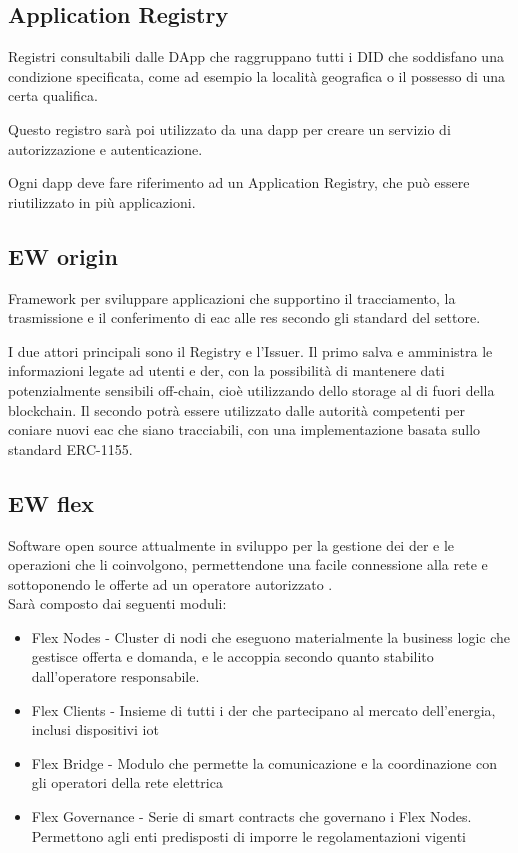 \subsection{Application Registry}
Registri consultabili dalle DApp che raggruppano tutti i DID che soddisfano una condizione specificata, come ad esempio la località geografica o il possesso di una certa qualifica.

Questo registro sarà poi utilizzato da una \gls{dapp} per creare un servizio di autorizzazione e autenticazione. 

Ogni \gls{dapp} deve fare riferimento ad un Application Registry, che può essere riutilizzato in più applicazioni.

\subsection{EW origin}
Framework per sviluppare applicazioni che supportino il tracciamento, la trasmissione e il conferimento di \gls{eac} alle \gls{res} secondo gli standard del settore. 

I due attori principali sono il Registry e l'Issuer. 
Il primo salva e amministra le informazioni legate ad utenti e \gls{der}, con la possibilità di mantenere dati potenzialmente sensibili off-chain, cioè utilizzando dello storage al di fuori della blockchain.
Il secondo potrà essere utilizzato dalle autorità competenti per coniare nuovi \gls{eac} che siano tracciabili, con una implementazione basata sullo standard ERC-1155.

\subsection{EW flex}
Software open source attualmente in sviluppo per la gestione dei \gls{der} e le operazioni che li coinvolgono, 
permettendone una facile connessione alla rete e sottoponendo le offerte ad un operatore autorizzato \cite{art:ew-dos}. \\

Sarà composto dai seguenti moduli:

\begin{itemize}
    \item Flex Nodes - Cluster di nodi che eseguono materialmente la business logic che gestisce offerta e domanda, e le accoppia secondo quanto stabilito dall'operatore responsabile.
    \item Flex Clients - Insieme di tutti i \gls{der} che partecipano al mercato dell'energia, inclusi dispositivi \gls{iot}
    \item Flex Bridge - Modulo che permette la comunicazione e la coordinazione con gli operatori della rete elettrica
    \item Flex Governance - Serie di smart contracts che governano i Flex Nodes. Permettono agli enti predisposti di imporre le regolamentazioni vigenti
\end{itemize}